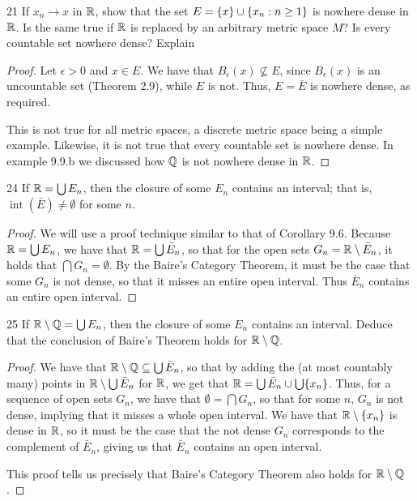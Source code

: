 \begin{exercise}{21}
If $x_n \to x$ in $\mathbb{R}$, show that the set $E = \{x\} \cup \{x_n: n \geq 1\}$ is nowhere dense in $\mathbb{R}$.
Is the same true if $\mathbb{R}$ is replaced by an arbitrary metric space $M$?
Is every countable set nowhere dense?
Explain
\end{exercise}
\begin{proof}
Let $\epsilon >0$ and $x \in E$.
We have that $B_\epsilon(x) \not\subseteq E$, since $B_\epsilon(x)$ is an uncountable set (Theorem 2.9), while $E$ is not.
Thus, $E = \bar{E}$ is nowhere dense, as required.

This is not true for all metric spaces, a discrete metric space being a simple example.
Likewise, it is not true that every countable set is nowhere dense.
In example 9.9.b we discussed how $\mathbb{Q}$ is not nowhere dense in $\mathbb{R}$.
\end{proof} 

\begin{exercise}{24}
If $\mathbb{R} = \bigcup E_n$, then the closure of some $E_n$ contains an interval;
that is, $\operatorname{int}(\bar{E}) \neq \emptyset$ for some $n$.
\end{exercise}
\begin{proof}
We will use a proof technique similar to that of Corollary 9.6.
Because $\mathbb{R} = \bigcup E_n$, we have that $\mathbb{R} = \bigcup \bar{E}_n$, so that for the open sets $G_n = \mathbb{R} \setminus \bar{E}_n$, it holds that $\bigcap G_n = \emptyset$.
By the Baire's Category Theorem, it must be the case that some $G_n$ is not dense, so that it misses an entire open interval. 
Thus $\bar{E}_n$ contains an entire open interval.
\end{proof} 

\begin{exercise}{25}
If $\mathbb{R} \setminus \mathbb{Q} = \bigcup E_n$, then the closure of some $E_n$ contains an interval.
Deduce that the conclusion of Baire's Theorem holds for $\mathbb{R} \setminus \mathbb{Q}$.
\end{exercise}
\begin{proof}
We have that $\mathbb{R} \setminus \mathbb{Q} \subseteq \bigcup \bar{E}_n$, so that by adding the (at most countably many) points in $\mathbb{R} \setminus \bigcup \bar{E}_n$ for $\mathbb{R}$, we get that $\mathbb{R} = \bigcup \bar{E}_n \cup \bigcup \{x_n\}$.
Thus, for a sequence of open sets $G_n$, we have that $\emptyset = \bigcap G_n$, so that for some $n$, $G_n$ is not dense, implying that it misses a whole open interval.
We have that $\mathbb{R} \setminus \{x_n\}$ is dense in $\mathbb{R}$, so it must be the case that the not dense $G_n$ corresponds to the complement of $\bar{E}_n$, giving us that $\bar{E}_n$ contains an open interval.

This proof tells us precisely that Baire's Category Theorem also holds for $\mathbb{R} \setminus \mathbb{Q}$.
\end{proof} 

